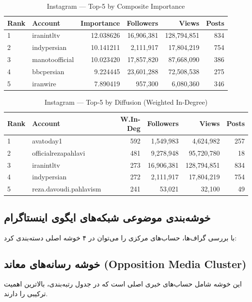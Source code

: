 \documentclass{article}
\begin{document}
\begin{table}[h!]
	\centering
	\begin{tabular}{llrrrr}
		\toprule
		Rank & Account & Importance & Followers & Views & Posts \\
		\midrule
		1 & iranintltv      & 12.038626 & 16,906,381 & 128,794,851 & 834 \\
		2 & indypersian     & 10.141211 & 2,111,917  & 17,804,219  & 754 \\
		3 & manotoofficial  & 10.023420 & 17,857,820 & 87,668,090  & 386 \\
		4 & bbcpersian      & 9.224445  & 23,601,288 & 72,508,538  & 275 \\
		5 & iranwire        & 7.890419  & 957,300    & 6,080,360   & 346 \\
		\bottomrule
	\end{tabular}
	\caption{Instagram — Top-5 by Composite Importance}
\end{table}


\begin{table}[h!]
	\centering
	\begin{tabular}{llrrrr}
		\toprule
		Rank & Account & W.In-Deg & Followers & Views & Posts \\
		\midrule
		1 & avatoday1              & 592 & 1,549,983 & 4,624,982  & 257 \\
		2 & officialrezapahlavi     & 481 & 9,278,948 & 95,720,780 & 18  \\
		3 & iranintltv              & 273 & 16,906,381& 128,794,851& 834 \\
		4 & indypersian             & 272 & 2,111,917 & 17,804,219 & 754 \\
		5 & reza.davoudi.pahlavism  & 241 & 53,021    & 32,100     & 49  \\
		\bottomrule
	\end{tabular}
	\caption{Instagram — Top-5 by Diffusion (Weighted In-Degree)}
\end{table}
	
	
\subsection{خوشه‌بندی موضوعی شبکه‌های ایگوی اینستاگرام}
	با بررسی گراف‌ها، حساب‌های مرکزی را می‌توان در ۴ خوشه اصلی دسته‌بندی کرد:
	
	\subsection{خوشه رسانه‌های معاند (Opposition Media Cluster)}
	این خوشه شامل حساب‌های خبری اصلی است که در جدول رتبه‌بندی، بالاترین اهمیت ترکیبی را دارند.
	
\end{document}
